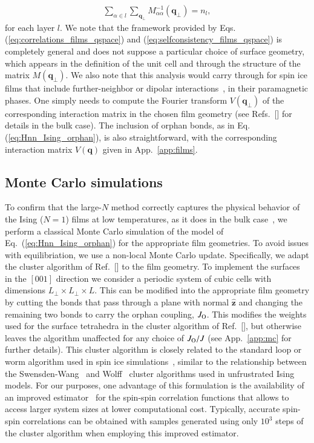 \documentclass[aps,prx,reprint,runinaddress,superscriptaddress,amsmath,amssymb,floatfix,longbibliography]{revtex4-1}
\renewcommand{\vec}[1]{\boldsymbol{#1}}
\newcommand{\vhat}[1]{\vec{\hat{#1}}}
\newcommand{\mat}[1]{#1}
\newcommand{\Jo}{J_{\rm O}}
\begin{document}
%
\begin{align}
\sum_{\alpha \in l} \sum_{\vec{q}_\perp} M^{-1}_{\alpha\alpha}(\vec{q}_\perp) = n_l,
\label{eq:selfconsistency_films_qspace}
\end{align}
%
for each layer $l$. We note that the framework provided by Eqs. (\ref{eq:correlations_films_qspace}) and (\ref{eq:selfconsistency_films_qspace}) is completely general and does not suppose a particular choice of surface geometry, which appears in the definition of the unit cell and through the structure of the matrix $\mat{M}(\vec{q}_\perp)$.
We also note that this analysis would carry through for spin ice films that include further-neighbor or dipolar interactions~\cite{Jaubert2016}, in their paramagnetic phases. One simply needs to compute the Fourier transform $\mat{V}(\vec{q}_\perp)$ of the corresponding interaction matrix in the chosen film geometry (see Refs.~[] for details in the bulk case). The inclusion of orphan bonds, as in Eq. (\ref{eq:Hnn_Ising_orphan}), is also straightforward, with the corresponding interaction matrix $V(\vec{q})$ given in App.~\ref{app:films}.


\subsection{Monte Carlo simulations}
\label{sec:methods:monte-carlo}
To confirm that the large-$N$ method correctly captures the physical behavior of the Ising ($N=1$) films at low temperatures, as it does in the bulk case~\cite{Isakov2004}, we perform a classical Monte Carlo simulation of the model of Eq.~(\ref{eq:Hnn_Ising_orphan}) for the appropriate film geometries. To avoid issues with equilibriation, we use a non-local Monte Carlo update. Specifically, we adapt the cluster algorithm of Ref.~[] to the film geometry. To implement the surfaces in the $[001]$ direction we consider a periodic system of cubic cells with dimensions $L_{\perp} \times L_{\perp} \times L$. This can be modified into the appropriate film geometry by cutting the bonds that pass through a plane with normal $\vhat{z}$ and changing the remaining two bonds to carry the orphan coupling, $\Jo$.  This modifies the weights used for the surface tetrahedra in the cluster algorithm of Ref.~[], but otherwise leaves the algorithm unaffected for any choice of $\Jo/J$ (see App.~\ref{app:mc} for further details). This cluster algorithm is closely related to the standard loop or worm algorithm used in spin ice simulations~\cite{Melko2001,melko2004monte}, similar to the relationship between the Swensden-Wang~\cite{swensden-1987-nonuniversal} and Wolff~\cite{wolff-1989-collective} cluster algorithms used in unfrustrated Ising models. For our purposes, one advantage of this formulation is the availability of an improved estimator~\cite{otsuka-2014-cluster} for the spin-spin correlation functions that allows to access larger system sizes at lower computational cost. Typically, accurate spin-spin correlations can be obtained with samples generated using only $10^3$ steps of the cluster algorithm when employing this improved estimator. 
\end{document}
